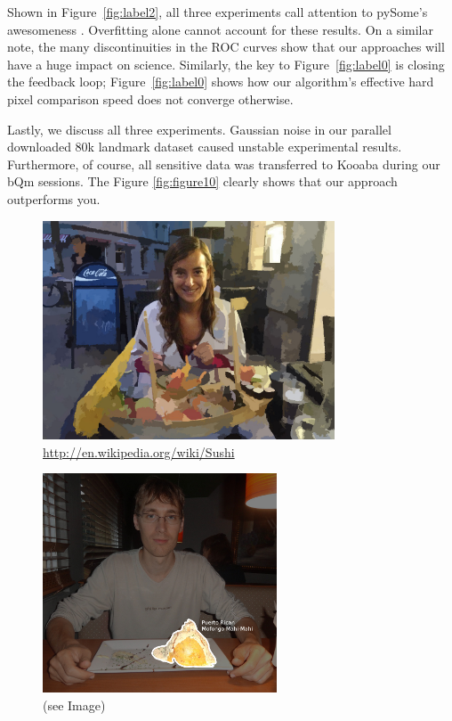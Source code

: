 \documentclass[runningheads]{llncs}
\begin{document}
Shown in Figure~\ref{fig:label2}, all three experiments call attention to
pySome's awesomeness . Overfitting alone cannot account for these results.
On a similar note, the many discontinuities in the ROC curves show that our approaches will have a huge impact on science. 
Similarly, the key to Figure~\ref{fig:label0} is closing the feedback
loop; Figure~\ref{fig:label0} shows how our algorithm's effective hard
pixel comparison speed does not converge otherwise.

Lastly, we discuss all three experiments. Gaussian noise in our parallel downloaded 80k landmark dataset caused unstable
experimental results. Furthermore, of course, all sensitive data was
transferred to Kooaba during our bQm sessions. 
The Figure \ref{fig:figure10} clearly shows that our approach outperforms you. 

\begin{figure} \centering \includegraphics[height=6.5cm]{images/gemma.jpg}
\caption{ \url{http://en.wikipedia.org/wiki/Sushi} } \label{fig:label90} \end{figure}

\begin{figure} \centering \includegraphics[height=6.5cm]{images/andras.jpg}
\caption{(see Image)} \label{fig:label91} \end{figure}
\end{document}
